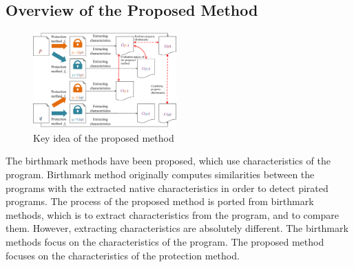 \documentclass[conference]{IEEEtran}
\begin{document}
% 
% 

\subsection{Overview of the Proposed Method}

\begin{figure}[b]
  \centering
  \includegraphics[width=0.49\textwidth]{images/key_idea}
  \caption{Key idea of the proposed method}\label{fig:keyidea}
\end{figure}

The birthmark methods have been proposed, which use characteristics of
the program\cite{tamada05ieice}.  Birthmark method originally computes
similarities between the programs with the extracted native
characteristics in order to detect pirated programs.
%
The process of the proposed method is ported from birthmark methods,
which is to extract characteristics from the program, and to compare
them.  However, extracting characteristics are absolutely different.
The birthmark methods focus on the characteristics of the program.
The proposed method focuses on the characteristics of the protection
method.
\end{document}
